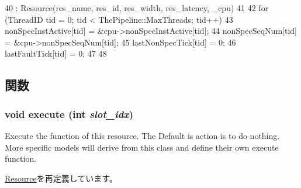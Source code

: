 \begin{DoxyCode}
40     : Resource(res_name, res_id, res_width, res_latency, _cpu)
41 {
42     for (ThreadID tid = 0; tid < ThePipeline::MaxThreads; tid++) {
43         nonSpecInstActive[tid] = &cpu->nonSpecInstActive[tid];
44         nonSpecSeqNum[tid] = &cpu->nonSpecSeqNum[tid];
45         lastNonSpecTick[tid] = 0;
46         lastFaultTick[tid] = 0;
47     }
48 }
\end{DoxyCode}


\subsection{関数}
\hypertarget{classGraduationUnit_a7b7fff82f8c9cbdb02add1346f60bb9e}{
\subsubsection[{execute}]{\setlength{\rightskip}{0pt plus 5cm}void execute (int {\em slot\_\-idx})}}
\label{classGraduationUnit_a7b7fff82f8c9cbdb02add1346f60bb9e}
Execute the function of this resource. The Default is action is to do nothing. More specific models will derive from this class and define their own execute function. 

\hyperlink{classResource_a39af49c5568d1db3f53c12d7d6914c32}{Resource}を再定義しています。


